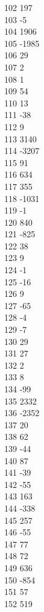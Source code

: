 { 102	197 \\
 103	-5 \\
 104	1906 \\
 105	-1985 \\
 106	29 \\
 107	2 \\
 108	1 \\
 109	54 \\
 110	13 \\
 111	-38 \\
 112	9 \\
 113	3140 \\
 114	-3207 \\
 115	91 \\
 116	634 \\
 117	355 \\
 118	-1031 \\
 119	-1 \\
 120	840 \\
 121	-825 \\
 122	38 \\
 123	9 \\
 124	-1 \\
 125	-16 \\
 126	9 \\
 127	-65 \\
 128	-4 \\
 129	-7 \\
 130	29 \\
 131	27 \\
 132	2 \\
 133	8 \\
 134	-99 \\
 135	2332 \\
 136	-2352 \\
 137	20 \\
 138	62 \\
 139	-44 \\
 140	87 \\
 141	-39 \\
 142	-55 \\
 143	163 \\
 144	-338 \\
 145	257 \\
 146	-55 \\
 147	77 \\
 148	72 \\
 149	636 \\
 150	-854 \\
 151	57 \\
 152	519 \\
}
